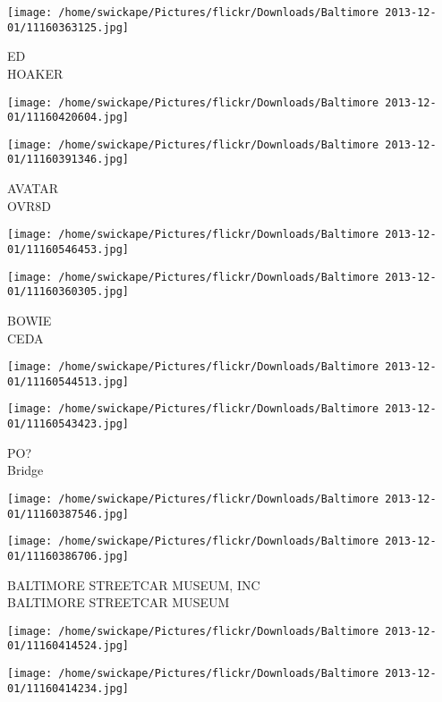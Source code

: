\documentclass[10pt,letterpaper]{article}
\begin{document}
\vspace{0.25in}
\texttt{[image: /home/swickape/Pictures/flickr/Downloads/Baltimore 2013-12-01/11160363125.jpg]}

ED\\
HOAKER
\pagebreak

\texttt{[image: /home/swickape/Pictures/flickr/Downloads/Baltimore 2013-12-01/11160420604.jpg]}

\vspace{0.25in}
\texttt{[image: /home/swickape/Pictures/flickr/Downloads/Baltimore 2013-12-01/11160391346.jpg]}

AVATAR\\
OVR8D
\pagebreak

\texttt{[image: /home/swickape/Pictures/flickr/Downloads/Baltimore 2013-12-01/11160546453.jpg]}

\vspace{0.25in}
\texttt{[image: /home/swickape/Pictures/flickr/Downloads/Baltimore 2013-12-01/11160360305.jpg]}

BOWIE\\
CEDA
\pagebreak

\texttt{[image: /home/swickape/Pictures/flickr/Downloads/Baltimore 2013-12-01/11160544513.jpg]}

\vspace{0.25in}
\texttt{[image: /home/swickape/Pictures/flickr/Downloads/Baltimore 2013-12-01/11160543423.jpg]}

PO?\\
Bridge
\pagebreak

\texttt{[image: /home/swickape/Pictures/flickr/Downloads/Baltimore 2013-12-01/11160387546.jpg]}

\vspace{0.25in}
\texttt{[image: /home/swickape/Pictures/flickr/Downloads/Baltimore 2013-12-01/11160386706.jpg]}

BALTIMORE STREETCAR MUSEUM, INC\\
BALTIMORE STREETCAR MUSEUM
\pagebreak

\texttt{[image: /home/swickape/Pictures/flickr/Downloads/Baltimore 2013-12-01/11160414524.jpg]}

\vspace{0.25in}
\texttt{[image: /home/swickape/Pictures/flickr/Downloads/Baltimore 2013-12-01/11160414234.jpg]}
\end{document}
